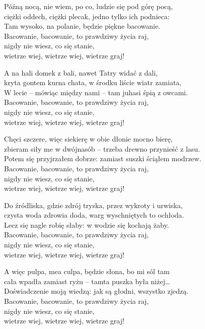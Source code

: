 \begin{text}
    Późną nocą, nie wiem, po co, ludzie się pod górę pocą,\\
    ciężki oddech, ciężki plecak, jedno tylko ich podnieca:\\
    Tam wysoko, na polanie, będzie piękne bacowanie.\\
    Bacowanie, bacowanie, to prawdziwy życia raj,\\
    nigdy nie wiesz, co się stanie,\\
    wietrze wiej, wietrze wiej, wietrze graj!

    A na hali domek z bali, nawet Tatry widać z dali,\\
    kryta gontem kurna chata, w środku liście wiatr zamiata,\\
    W lecie – mówiąc między nami – tam juhasi śpią z owcami.\\
    Bacowanie, bacowanie, to prawdziwy życia raj,\\
    nigdy nie wiesz, co się stanie,\\
    wietrze wiej, wietrze wiej, wietrze graj!

    Chęci szczere, więc siekierę w obie dłonie mocno bierę,\\
    zbieram siły me w dwójnasób – trzeba drewno przynieść z lasu.\\
    Potem się przyjrzałem dobrze: zamiast suszki ściąłem modrzew.\\
    Bacowanie, bacowanie, to prawdziwy życia raj,\\
    nigdy nie wiesz, co się stanie,\\ 
    wietrze wiej, wietrze wiej, wietrze graj!

    Do źródliska, gdzie zdrój tryska, przez wykroty i urwiska,\\
    czysta woda zdrowia doda, warg wyschniętych to ochłoda.\\
    Lecz się nagle robię słaby: w wodzie się kochają żaby.\\
    Bacowanie, bacowanie, to prawdziwy życia raj,\\
    nigdy nie wiesz, co się stanie,\\
    wietrze wiej, wietrze wiej, wietrze graj!

    A więc pulpa, mea culpa, będzie słona, bo mi sól tam\\
    cała wpadła zamiast ryżu – tamta puszka była niżej…\\
    Doświadczenie moją wiedzą: jak są głodni, wszystko zjedzą.\\
    Bacowanie, bacowanie, to prawdziwy życia raj,\\
    nigdy nie wiesz, co się stanie,\\ 
    wietrze wiej, wietrze wiej, wietrze graj!


\end{text}
